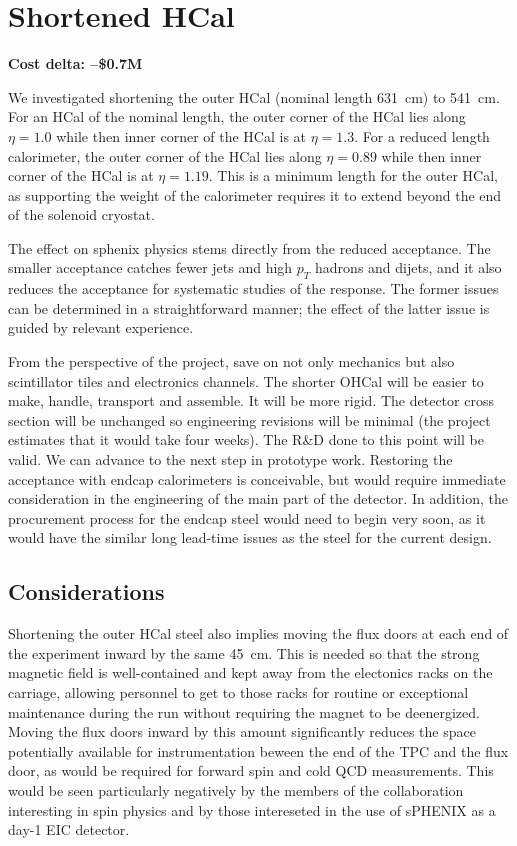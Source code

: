 \section*{Shortened HCal}
\label{ohcal_short}

\textbf{Cost delta: --\$0.7M}
 
We investigated shortening the outer HCal (nominal length 631~cm) to
541~cm.  For an HCal of the nominal length, the outer corner of the
HCal lies along $\eta = 1.0$ while then inner corner of the HCal is at
$\eta = 1.3$.  For a reduced length calorimeter, the outer corner of
the HCal lies along $\eta = 0.89$ while then inner corner of the HCal
is at $\eta = 1.19$.  This is a minimum length for the outer HCal, as
supporting the weight of the calorimeter requires it to extend beyond
the end of the solenoid cryostat.

The effect on sphenix physics stems directly from the reduced
acceptance.  The smaller acceptance catches fewer jets and high $p_T$
hadrons and dijets, and it also reduces the acceptance for systematic
studies of the response.  The former issues can be determined in a
straightforward manner; the effect of the latter issue is guided by
relevant experience.

From the perspective of the project, save on not only mechanics but
also scintillator tiles and electronics channels.  The shorter OHCal
will be easier to make, handle, transport and assemble.  It will be
more rigid.  The detector cross section will be unchanged so
engineering revisions will be minimal (the project estimates that it
would take four weeks). The R\&D done to this point will be valid.  We
can advance to the next step in prototype work.  Restoring the
acceptance with endcap calorimeters is conceivable, but would require
immediate consideration in the engineering of the main part of the
detector.  In addition, the procurement process for the endcap steel
would need to begin very soon, as it would have the similar long
lead-time issues as the steel for the current design.

\subsection*{Considerations}

Shortening the outer HCal steel also implies moving the flux doors at
each end of the experiment inward by the same 45~cm.  This is needed
so that the strong magnetic field is well-contained and kept away from
the electonics racks on the carriage, allowing personnel to get to
those racks for routine or exceptional maintenance during the run
without requiring the magnet to be deenergized.  Moving the flux doors
inward by this amount significantly reduces the space potentially
available for instrumentation beween the end of the TPC and the flux
door, as would be required for forward spin and cold QCD measurements.
This would be seen particularly negatively by the members of the
collaboration interesting in spin physics and by those intereseted in
the use of sPHENIX as a day-1 EIC detector.
